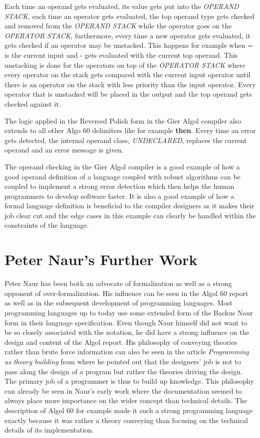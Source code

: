 \documentclass{article}
\begin{document}
Each time an operand gets evaluated, its value gets put into the \textit{OPERAND STACK}, each time an operator gets evaluated, the top operand type gets checked and removed from the \textit{OPERAND STACK} while the operator goes on the \textit{OPERATOR STACK}, furthermore, every time a new operator gets evaluated, it gets checked if an operator may be unstacked. This happens for example when = is the current input and - gets evaluated with the current top operand. This unstacking is done for the operators on top of the \textit{OPERATOR STACK} where every operator on the stack gets compared with the current input operator until there is an operator on the stack with less priority than the input operator. Every operator that is unstacked will be placed in the output and the top operand gets checked against it.

The logic applied in the Reversed Polish form in the Gier Algol compiler also extends to all other Algo 60 delimiters like for example \textbf{then}. Every time an error gets detected, the internal operand class, \textit{UNDECLARED}, replaces the current operand and an error message is given.

The operand checking in the Gier Algol compiler is a good example of how a good operand definition of a language coupled with robust algorithms can be coupled to implement a strong error detection which then helps the human programmers to develop software faster. It is also a good example of how a formal language definition is beneficial to the compiler designers as it makes their job clear cut and the edge cases in this example can clearly be handled within the constraints of the language.

\section{Peter Naur's Further Work}
Peter Naur has been both an advocate of formalization as well as a strong opponent of over-formalization. His influence can be seen in the Algol 60 report as well as in the subsequent development of programming languages. Most programming languages up to today use some extended form of the Backus Naur form in their language specification. Even though Naur himself did not want to be so closely associated with the notation, he did have a strong influence on the design and content of the Algol report. His philosophy of conveying theories rather than brute force information can also be seen in the article \textit{Programming as theory building} from \cite{naur1985programming} where he pointed out that the designers' job is not to pass along the design of a program but rather the theories driving the design. The primary job of a programmer is thus to build up knowledge. This philosophy can already be seen in Naur's early work where the documentation seemed to always place more importance on the wider concept than technical details. The description of Algol 60 for example made it such a strong programming language exactly because it was rather a theory conveying than focusing on the technical details of its implementation.
\end{document}
